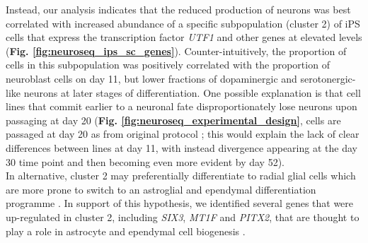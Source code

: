 Instead, our analysis indicates that the reduced production of neurons was best correlated with increased abundance of a specific subpopulation (cluster 2) of iPS cells that express the transcription factor \textit{UTF1} and other genes at elevated levels (\textbf{Fig. \ref{fig:neuroseq_ips_sc_genes}}).
Counter-intuitively, the proportion of cells in this subpopulation was positively correlated with the proportion of neuroblast cells on day 11, but lower fractions of dopaminergic and serotonergic-like neurons at later stages of differentiation. 
One possible explanation is that cell lines that commit earlier to a neuronal fate disproportionately lose neurons upon passaging at day 20 (\textbf{Fig. \ref{fig:neuroseq_experimental_design}}, cells are passaged at day 20 as from original protocol \cite{kriks2011dopamine}; this would explain the lack of clear differences between lines at day 11, with instead divergence appearing at the day 30 time point and then becoming even more evident by day 52).
\\

In alternative, cluster 2 may preferentially differentiate to radial glial cells which are more prone to switch to an astroglial and ependymal differentiation programme \cite{spassky2005adult}. 
In support of this hypothesis, we identified several genes that were up-regulated in cluster 2, including \textit{SIX3}, \textit{MT1F} and \textit{PITX2}, that are thought to play a role in astrocyte and ependymal cell biogenesis \cite{lavado2011six3, michael2011up, jacquet2009foxj1}. \\




